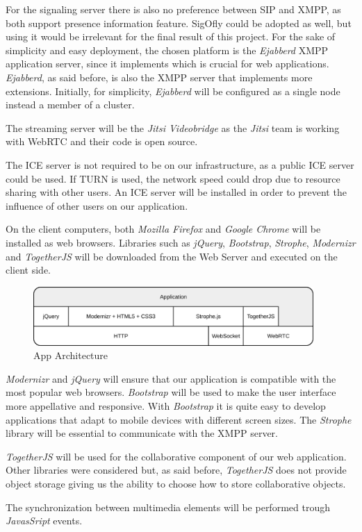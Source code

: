 For the signaling server there is also no preference between \ac{SIP} and \ac{XMPP}, as both support presence information feature. \ac{SigOfly} could be adopted as well, but using it would be irrelevant for the final result of this project. For the sake of simplicity and easy deployment, the chosen platform is the \emph{Ejabberd} \ac{XMPP} application server, since it implements \cite{xep0206} which is crucial for web applications. \emph{Ejabberd}, as said before, is also the \ac{XMPP} server that implements more extensions. Initially, for simplicity, \emph{Ejabberd} will be configured as a single node instead a member of a cluster. 

The streaming server will be the \emph{Jitsi Videobridge} as the \emph{Jitsi} team is working with \ac{WebRTC} and their code is open source.

The \ac{ICE} server is not required to be on our infrastructure, as a public \ac{ICE} server could be used. If \ac{TURN} is used, the network speed could drop due to resource sharing with other users. An \ac{ICE} server will be installed in order to prevent the influence of other users on our application.

On the client computers, both \emph{Mozilla Firefox} and \emph{Google Chrome} will be installed as web browsers. Libraries such as \emph{jQuery}, \emph{Bootstrap}, \emph{Strophe}, \emph{Modernizr} and \emph{TogetherJS} will be downloaded from the Web Server and executed on the client side.

\begin{figure}[H]
	\centering
	\includegraphics[width=0.95\textwidth]{figures/apparch.png}
	\caption{App Architecture}
\end{figure}

\emph{Modernizr} and \emph{jQuery} will ensure that our application is compatible with the most popular web browsers.
\emph{Bootstrap} will be used to make the user interface more appellative and responsive. With \emph{Bootstrap} it is quite easy to develop applications that adapt to mobile devices with different screen sizes.
The \emph{Strophe} library will be essential to communicate with the \ac{XMPP} server.


\emph{TogetherJS} will be used for the collaborative component of our web application. Other libraries were considered but, as said before, \emph{TogetherJS} does not provide object storage giving us the ability to choose how to store collaborative objects.

The synchronization between multimedia elements will be performed trough \emph{JavasSript} events.
